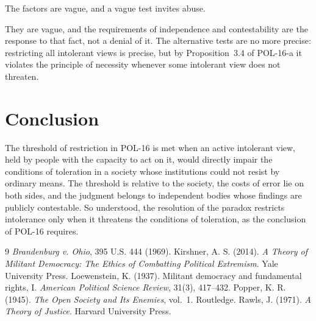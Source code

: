 \documentclass{situationist-preprint}
\begin{document}
\begin{objection}
The factors are vague, and a vague test invites abuse.
\end{objection}

\begin{reply}
They are vague, and the requirements of independence and contestability are the response to that fact, not a denial of it. The alternative tests are no more precise: restricting all intolerant views is precise, but by Proposition~3.4 of POL-16-a it violates the principle of necessity whenever some intolerant view does not threaten.
\end{reply}

\section{Conclusion}

The threshold of restriction in POL-16 is met when an active intolerant view, held by people with the capacity to act on it, would directly impair the conditions of toleration in a society whose institutions could not resist by ordinary means. The threshold is relative to the society, the costs of error lie on both sides, and the judgment belongs to independent bodies whose findings are publicly contestable. So understood, the resolution of the paradox restricts intolerance only when it threatens the conditions of toleration, as the conclusion of POL-16 requires.

\begin{thebibliography}{9}\small
{} \emph{Brandenburg v. Ohio}, 395 U.S. 444 (1969).
 Kirshner, A. S. (2014). \emph{A Theory of Militant Democracy: The Ethics of Combatting Political Extremism}. Yale University Press.
 Loewenstein, K. (1937). Militant democracy and fundamental rights, I. \emph{American Political Science Review}, 31(3), 417--432.
 Popper, K. R. (1945). \emph{The Open Society and Its Enemies}, vol.~1. Routledge.
 Rawls, J. (1971). \emph{A Theory of Justice}. Harvard University Press.
\end{thebibliography}
\end{document}
